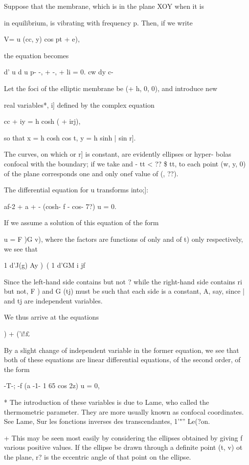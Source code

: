 %
%

Suppose that the membrane, which is in the plane XOY when it is

in equilibrium, is vibrating with frequency p. Then, if we write

V= u (cc, y) cos pt + e),

the equation becomes

d' u d u p- -, + -, + li = 0. cw dy c-

Let the foci of the elliptic membrane be (+ h, 0, 0), and introduce
new

real variables*, i] defined by the complex equation

cc + iy = h cosh ( + irj),

so that x = h cosh cos t, y = h sinh | sin r].

The curves, on which or r] is constant, are evidently ellipses or
hyper- bolas confocal with the boundary; if we take and - tt < ?? \$
tt, to each point (w, y, 0) of the plane corresponds one and only onef
value of (, ??).

The differential equation for u transforms into;]:

af-2 + a + - (cosh- f - cos- 7?) u = 0.

If we assume a solution of this equation of the form

u = F )G v), where the factors are functions of only and of t) only
respectively, we see that

1 d'J(g) Ay )\ ( 1 d'GM i jf

Since the left-hand side contains but not ? while the right-hand side
contains ri but not, F ) and G (tj) must be such that each side is a
constant, A, say, since | and tj are independent variables.

We thus arrive at the equations

 ) + ('i!£%

By a slight change of independent variable in the former equation, we
see that both of these equations are linear differential equations, of
the second order, of the form

-T-; -f (a -1- 1 65 cos 2z) u = 0,

* The iutroduction of these variables is due to Lame, who called the
thermometric parameter. They are more usually known as confocal
coordinates. See Lame, Sur les fonctions inverses des transcendantes,
1'"'' Le(?on.

+ This may be seen most easily by considering the ellipses obtained by
giving f various positive values. If the ellipse be drawn through a
definite point (t, v) ot the plane, r? is the eccentric angle of that
point on the ellipse.

